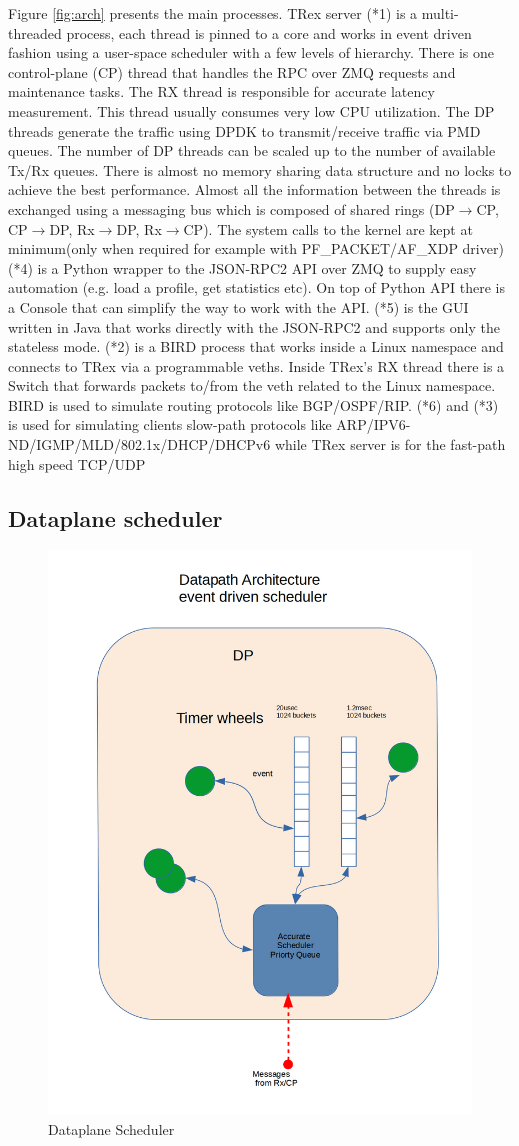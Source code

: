 \documentclass[letterpaper]{article}
\begin{document}
Figure \ref{fig:arch} presents the main processes. TRex server (*1) is a multi-threaded process, each thread is pinned to a core and works in 
event driven fashion using a user-space scheduler with a few levels of hierarchy. There is one control-plane (CP) thread that handles the RPC over ZMQ requests and maintenance tasks. 
The RX thread is responsible for accurate latency measurement. This thread usually consumes very low CPU utilization. 
The DP threads generate the traffic using DPDK to transmit/receive traffic via PMD queues. 
The number of DP threads can be scaled up to the number of available Tx/Rx queues. 
There is almost no memory sharing data structure and no locks to achieve the best performance. 
Almost all the information between the threads is exchanged using a messaging bus which 
is composed of shared rings (DP$\rightarrow$CP, CP$\rightarrow$DP, Rx$\rightarrow$DP, Rx$\rightarrow$CP).
The system calls to the kernel are kept at minimum(only when required for example with PF\_PACKET/AF\_XDP driver)
(*4) is a Python wrapper to the JSON-RPC2 API over ZMQ to supply easy automation (e.g. load a profile, get statistics etc).
On top of Python API there is a Console that can simplify the way to work with the API. 
(*5) is the GUI written in Java that works directly with the JSON-RPC2 and supports only the stateless mode.
(*2) is a BIRD \cite{b4} process that works inside a Linux namespace and connects to TRex via a programmable veths. Inside TRex's RX thread there is a Switch that forwards packets to/from the veth related to the Linux namespace. 
BIRD is used to simulate routing protocols like BGP/OSPF/RIP.
(*6) and (*3) is used for simulating clients slow-path protocols like ARP/IPV6-ND/IGMP/MLD/802.1x/DHCP/DHCPv6 while TRex server is for the fast-path high speed TCP/UDP

\subsection{Dataplane scheduler}

\begin{figure}[h]
\includegraphics[width=0.3
\textwidth, center]{trex_dp_sheduler.png}
\caption{Dataplane Scheduler}
\label{fig:dp_schduler}
\end{figure}
  
\end{document}
